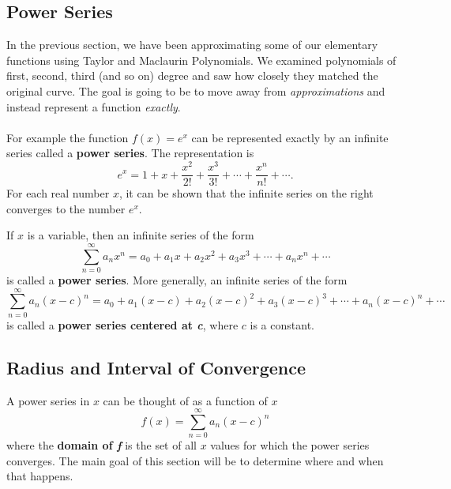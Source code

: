 \documentclass[addpoints, 12pt]{exam}
\begin{document}
\newpage
{}
\subsection*{Power Series}
In the previous section, we have been approximating some of our elementary functions using Taylor and Maclaurin Polynomials. We examined polynomials of first, second, third (and so on) degree and saw how closely they matched the original curve. The goal is going to be to move away from \textit{approximations} and instead represent a function \textit{exactly}.\\
\\
For example the function $f(x)=e^x$ can be represented exactly by an infinite series called a \textbf{power series}. The representation is
\[e^x=1+x+\frac{x^2}{2!}+\frac{x^3}{3!}+\cdots+\frac{x^n}{n!}+\cdots.\]
For each real number $x$, it can be shown that the infinite series on the right converges to the number $e^x$.\\


\begin{tcolorbox}[title= DEFINITIONS OF POWER SERIES,colframe=black,sharp corners,colback=white,colbacktitle=white,coltitle=black]

    If $x$ is a variable, then an infinite series of the form
    \[\sum_{n=0}^{\infty}a_n x^n=a_0 + a_1 x+a_2 x^2+a_3 x^3+\cdots+a_n x^n+\cdots\]
    is called a \textbf{power series}. More generally, an infinite series of the form
    \[\sum_{n=0}^{\infty}a_n (x-c)^n=a_0 + a_1 (x-c)+a_2 (x-c)^2+a_3 (x-c)^3+\cdots+a_n (x-c)^n+\cdots\]
    is called a \textbf{power series centered at \textit{c}}, where $c$ is a constant.

\end{tcolorbox}
\vspace{.1in}

\subsection*{Radius and Interval of Convergence}
A power series in $x$ can be thought of as a function of $x$
\[f(x)=\sum_{n=0}^{\infty}a_n (x-c)^n\]
where the \textbf{domain of \textit{f}} is the set of all $x$ values for which the power series converges. The main goal of this section will be to determine where and when that happens.
\end{document}

